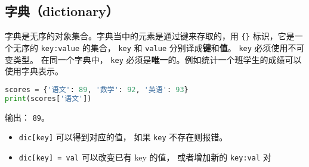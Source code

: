 \subsection{字典（dictionary）}
字典是无序的对象集合。字典当中的元素是通过键来存取的，用 \verb|{}| 标识，它是一个无序的 \verb|key:value| 的集合， \verb|key| 和 \verb|value| 分别译成\textbf{键}和\textbf{值}。 \verb|key| 必须使用不可变类型。 在同一个字典中， \verb|key| 必须是\textbf{唯一}的。例如统计一个班学生的成绩可以使用字典表示。
\begin{lstlisting}[language=python]
scores = {'语文': 89, '数学': 92, '英语': 93}
print(scores['语文'])
\end{lstlisting}
输出： \verb|89|。

\begin{itemize}
\item \verb|dic[key]| 可以得到对应的值， 如果 \verb|key| 不存在则报错。
\item \verb|dic[key] = val| 可以改变已有 key 的值， 或者增加新的 \verb|key:val| 对
\end{itemize}
